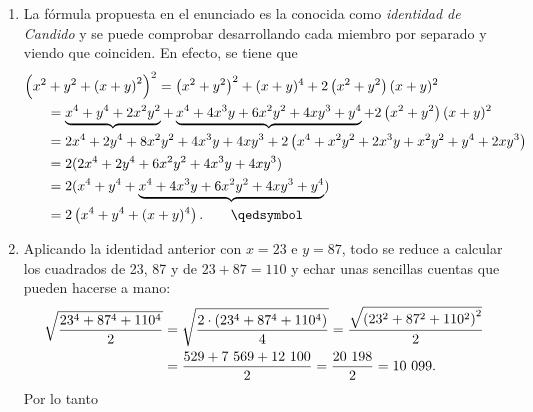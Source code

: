 \documentclass[
    fecha={5 de agosto de 2025},palabrasclave={RetoSecundaria, ago2025, álgebra, dif1},codigo=minted
    ]{RetoMatematico}
\begin{document}
\maketitle
\thispagestyle{empty}


\forma
\begin{enumerate}[label=\emph{\alph*})]
\item La fórmula propuesta en el enunciado es la conocida como \emph{identidad de Candido} y se puede comprobar desarrollando cada miembro por separado y viendo que coinciden. En efecto, se tiene que
\begin{align*}
	\Bigl(x^2&+y^2+\l(x+y\r)^2\Bigr)^2 = \l(x^2 + y^2\r)^2 + (x+y)^4 + 2\l(x^2 + y^2\r)(x+y)^2\\
	&= \underbrace{x^4 + y^4 + 2x^2y^2}+\underbrace{x^4 + 4x^3y + 6x^2y^2 + 4xy^3 + y^4} + 2\l(x^2 + y^2\r)(x+y)^2\\
	&= 2x^4 + 2y^4 + 8x^2y^2 + 4x^3y + 4xy^3 + 2\l(x^4 + x^2y^2 + 2x^3 y + x^2 y^2 + y^4 + 2xy^3\r)\\
	&= 2(2x^4 + 2y^4 + 6x^2y^2 + 4x^3 y + 4xy^3)\\
	&= 2(x^4 + y^4 + \underbrace{x^4 + 4x^3 y + 6x^2y^2 + 4xy^3 + y^4})\\
	&= 2\l(x^4 + y^4 + (x+y)^4\r). \tag*{\qedsymbol}
\end{align*}

\item Aplicando la identidad anterior con $x = 23$ e $y = 87$, todo se reduce a calcular los
cuadrados de 23, 87 y de $23 + 87 = 110$ y echar unas sencillas cuentas que pueden hacerse
a mano: \begin{align*}
	\sqrt{\frac{23^4+87^4+110^4}{2}} &= \sqrt{\frac{2\cdot\l(23^4+87^4+110^4\r)}{4}} = \frac{\sqrt{\l(23^2+87^2+110^2\r)^2}}{2}\\
	&= \frac{529 + 7\ 569 + 12\ 100}{2} = \frac{20\ 198}{2} = 10\ 099.
\end{align*} Por lo tanto 
\end{enumerate}
\end{document}
